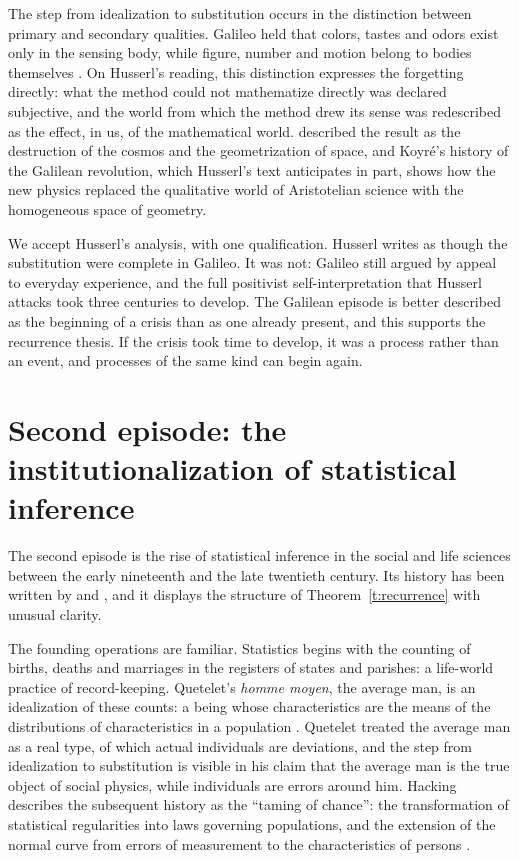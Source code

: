 \documentclass{situationist-preprint}
\begin{document}
The step from idealization to substitution occurs in the distinction between primary and secondary qualities. Galileo held that colors, tastes and odors exist only in the sensing body, while figure, number and motion belong to bodies themselves \citep{Galileo1623}. On Husserl's reading, this distinction expresses the forgetting directly: what the method could not mathematize directly was declared subjective, and the world from which the method drew its sense was redescribed as the effect, in us, of the mathematical world. \citet{Koyre1957} described the result as the destruction of the cosmos and the geometrization of space, and Koyré's history of the Galilean revolution, which Husserl's text anticipates in part, shows how the new physics replaced the qualitative world of Aristotelian science with the homogeneous space of geometry.

We accept Husserl's analysis, with one qualification. Husserl writes as though the substitution were complete in Galileo. It was not: Galileo still argued by appeal to everyday experience, and the full positivist self-interpretation that Husserl attacks took three centuries to develop. The Galilean episode is better described as the beginning of a crisis than as one already present, and this supports the recurrence thesis. If the crisis took time to develop, it was a process rather than an event, and processes of the same kind can begin again.

\section{Second episode: the institutionalization of statistical inference}\label{s:statistics}

The second episode is the rise of statistical inference in the social and life sciences between the early nineteenth and the late twentieth century. Its history has been written by \citet{Hacking1990} and \citet{Porter1995}, and it displays the structure of Theorem~\ref{t:recurrence} with unusual clarity.

The founding operations are familiar. Statistics begins with the counting of births, deaths and marriages in the registers of states and parishes: a life-world practice of record-keeping. Quetelet's \emph{homme moyen}, the average man, is an idealization of these counts: a being whose characteristics are the means of the distributions of characteristics in a population \citep{Quetelet1835}. Quetelet treated the average man as a real type, of which actual individuals are deviations, and the step from idealization to substitution is visible in his claim that the average man is the true object of social physics, while individuals are errors around him. Hacking describes the subsequent history as the \enquote{taming of chance}: the transformation of statistical regularities into laws governing populations, and the extension of the normal curve from errors of measurement to the characteristics of persons \citep{Hacking1990}.
\end{document}
